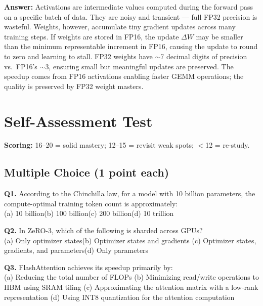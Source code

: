 \documentclass[11pt, a4paper]{article}
\begin{document}
\begin{notebox}
\textbf{Answer:} Activations are intermediate values computed during the forward pass on a specific batch of data. They are noisy and transient --- full FP32 precision is wasteful. Weights, however, accumulate tiny gradient updates across many training steps. If weights are stored in FP16, the update $\Delta W$ may be smaller than the minimum representable increment in FP16, causing the update to round to zero and learning to stall. FP32 weights have $\sim$7 decimal digits of precision vs.\ FP16's $\sim$3, ensuring small but meaningful updates are preserved. The speedup comes from FP16 activations enabling faster GEMM operations; the quality is preserved by FP32 weight masters.
\end{notebox}

\newpage
\section{Self-Assessment Test}

\textbf{Scoring:} 16--20 = solid mastery; 12--15 = revisit weak spots; $<$12 = re-study.

\subsection*{Multiple Choice (1 point each)}

\textbf{Q1.} According to the Chinchilla law, for a model with 10 billion parameters, the compute-optimal training token count is approximately:\\
(a) 10 billion\quad (b) 100 billion\quad (c) 200 billion\quad (d) 10 trillion

\textbf{Q2.} In ZeRO-3, which of the following is sharded across GPUs?\\
(a) Only optimizer states\quad (b) Optimizer states and gradients\quad
(c) Optimizer states, gradients, and parameters\quad (d) Only parameters

\textbf{Q3.} FlashAttention achieves its speedup primarily by:\\
(a) Reducing the total number of FLOPs\quad
(b) Minimizing read/write operations to HBM using SRAM tiling\quad
(c) Approximating the attention matrix with a low-rank representation\quad
(d) Using INT8 quantization for the attention computation
\end{document}
